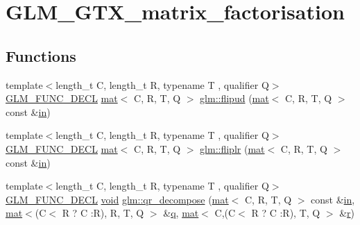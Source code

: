 \hypertarget{group__gtx__matrix__factorisation}{}\section{G\+L\+M\+\_\+\+G\+T\+X\+\_\+matrix\+\_\+factorisation}
\label{group__gtx__matrix__factorisation}
\subsection*{Functions}
\begin{DoxyCompactItemize}
\item 
{\footnotesize template$<$length\+\_\+t C, length\+\_\+t R, typename T , qualifier Q$>$ }\\\mbox{\hyperlink{setup_8hpp_ab2d052de21a70539923e9bcbf6e83a51}{G\+L\+M\+\_\+\+F\+U\+N\+C\+\_\+\+D\+E\+CL}} \mbox{\hyperlink{structglm_1_1mat}{mat}}$<$ C, R, T, Q $>$ \mbox{\hyperlink{group__gtx__matrix__factorisation_ga85003371f0ba97380dd25e8905de1870}{glm\+::flipud}} (\mbox{\hyperlink{structglm_1_1mat}{mat}}$<$ C, R, T, Q $>$ const \&\mbox{\hyperlink{_s_d_l__opengl__glext_8h_a83ad0ee7f1e06b59c90271716e689080}{in}})
\item 
{\footnotesize template$<$length\+\_\+t C, length\+\_\+t R, typename T , qualifier Q$>$ }\\\mbox{\hyperlink{setup_8hpp_ab2d052de21a70539923e9bcbf6e83a51}{G\+L\+M\+\_\+\+F\+U\+N\+C\+\_\+\+D\+E\+CL}} \mbox{\hyperlink{structglm_1_1mat}{mat}}$<$ C, R, T, Q $>$ \mbox{\hyperlink{group__gtx__matrix__factorisation_gaf39f4e5f78eb29c1a90277d45b9b3feb}{glm\+::fliplr}} (\mbox{\hyperlink{structglm_1_1mat}{mat}}$<$ C, R, T, Q $>$ const \&\mbox{\hyperlink{_s_d_l__opengl__glext_8h_a83ad0ee7f1e06b59c90271716e689080}{in}})
\item 
{\footnotesize template$<$length\+\_\+t C, length\+\_\+t R, typename T , qualifier Q$>$ }\\\mbox{\hyperlink{setup_8hpp_ab2d052de21a70539923e9bcbf6e83a51}{G\+L\+M\+\_\+\+F\+U\+N\+C\+\_\+\+D\+E\+CL}} \mbox{\hyperlink{_s_d_l__opengles2__gl2ext_8h_ae5d8fa23ad07c48bb609509eae494c95}{void}} \mbox{\hyperlink{group__gtx__matrix__factorisation_ga77022dca1aa38add548f9f56a9f8071a}{glm\+::qr\+\_\+decompose}} (\mbox{\hyperlink{structglm_1_1mat}{mat}}$<$ C, R, T, Q $>$ const \&\mbox{\hyperlink{_s_d_l__opengl__glext_8h_a83ad0ee7f1e06b59c90271716e689080}{in}}, \mbox{\hyperlink{structglm_1_1mat}{mat}}$<$(C$<$ R ? C \+:R), R, T, Q $>$ \&\mbox{\hyperlink{_s_d_l__opengl_8h_a8fc1e7b9baaae687804c7eed46ca09c6}{q}}, \mbox{\hyperlink{structglm_1_1mat}{mat}}$<$ C,(C$<$ R ? C \+:R), T, Q $>$ \&\mbox{\hyperlink{_s_d_l__opengl_8h_a42ce7cdc612e53abee15043f80220d97}{r}})

\end{DoxyCompactItemize}
